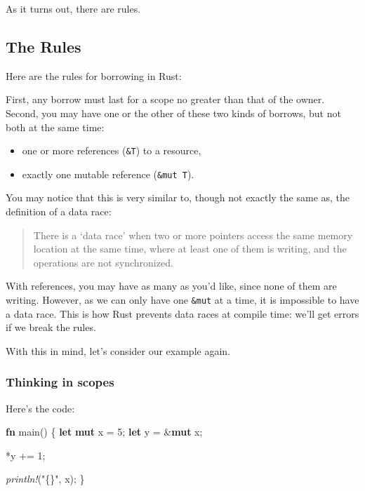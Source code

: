 \documentclass[a4paper,]{book}
\newenvironment{Shaded}{\begin{snugshade}}{\end{snugshade}}
\newcommand{\KeywordTok}[1]{\textcolor[rgb]{0.13,0.29,0.53}{\textbf{{#1}}}}
\newcommand{\DecValTok}[1]{\textcolor[rgb]{0.00,0.00,0.81}{{#1}}}
\newcommand{\StringTok}[1]{\textcolor[rgb]{0.31,0.60,0.02}{{#1}}}
\newcommand{\PreprocessorTok}[1]{\textcolor[rgb]{0.56,0.35,0.01}{\textit{{#1}}}}
\newcommand{\NormalTok}[1]{{#1}}
\providecommand{\tightlist}{%
  \setlength{\itemsep}{0pt}\setlength{\parskip}{0pt}}
\begin{document}
As it turns out, there are rules.

\subsection{The Rules}\label{the-rules}

Here are the rules for borrowing in Rust:

First, any borrow must last for a scope no greater than that of the
owner. Second, you may have one or the other of these two kinds of
borrows, but not both at the same time:

\begin{itemize}
\tightlist
\item
  one or more references (\texttt{\&T}) to a resource,
\item
  exactly one mutable reference (\texttt{\&mut\ T}).
\end{itemize}

You may notice that this is very similar to, though not exactly the same
as, the definition of a data race:

\begin{quote}
There is a `data race' when two or more pointers access the same memory
location at the same time, where at least one of them is writing, and
the operations are not synchronized.
\end{quote}

With references, you may have as many as you'd like, since none of them
are writing. However, as we can only have one \texttt{\&mut} at a time,
it is impossible to have a data race. This is how Rust prevents data
races at compile time: we'll get errors if we break the rules.

With this in mind, let's consider our example again.

\subsubsection{Thinking in scopes}\label{thinking-in-scopes}

Here's the code:

\begin{Shaded}
\begin{Highlighting}[]
\KeywordTok{fn} \NormalTok{main() \{}
    \KeywordTok{let} \KeywordTok{mut} \NormalTok{x = }\DecValTok{5}\NormalTok{;}
    \KeywordTok{let} \NormalTok{y = &}\KeywordTok{mut} \NormalTok{x;}

    \NormalTok{*y += }\DecValTok{1}\NormalTok{;}

    \PreprocessorTok{println!}\NormalTok{(}\StringTok{"\{\}"}\NormalTok{, x);}
\NormalTok{\}}
\end{Highlighting}
\end{Shaded}
\end{document}
